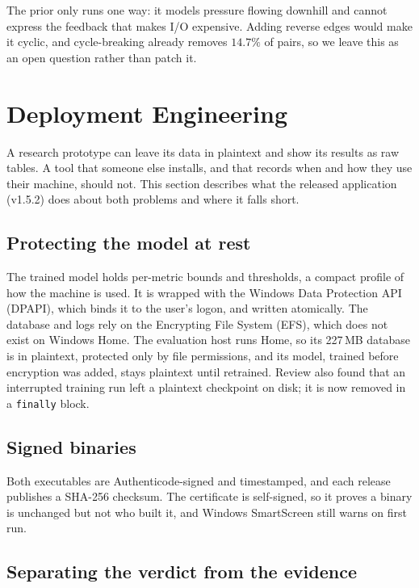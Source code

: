 \documentclass[conference,a4paper]{IEEEtran}
\begin{document}
The prior only runs one way: it models pressure flowing downhill and cannot
express the feedback that makes I/O expensive. Adding reverse edges would make
it cyclic, and cycle-breaking already removes $14.7\%$ of pairs, so we leave
this as an open question rather than patch it.

\section{Deployment Engineering}
\label{sec:deploy}

A research prototype can leave its data in plaintext and show its results as
raw tables. A tool that someone else installs, and that records when and how
they use their machine, should not. This section describes what the released
application (v1.5.2) does about both problems and where it falls short.

\subsection{Protecting the model at rest}

The trained model holds per-metric bounds and thresholds, a compact profile
of how the machine is used. It is wrapped with the Windows Data Protection
API (DPAPI), which binds it to the user's logon, and written atomically.
The database and logs rely on the Encrypting File System (EFS), which does
not exist on Windows Home. The evaluation host runs Home, so its 227\,MB
database is in plaintext, protected only by file permissions, and its model,
trained before encryption was added, stays plaintext until retrained. Review
also found that an interrupted training run left a plaintext checkpoint on
disk; it is now removed in a \texttt{finally} block.

\subsection{Signed binaries}

Both executables are Authenticode-signed and timestamped, and each release
publishes a SHA-256 checksum. The certificate is self-signed, so it proves a
binary is unchanged but not who built it, and Windows SmartScreen still warns
on first run.

\subsection{Separating the verdict from the evidence}
\end{document}
